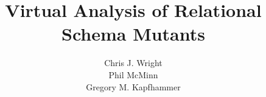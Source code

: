 \documentclass{sig-alternate}
\begin{document}
\title{Virtual Analysis of Relational Schema Mutants}


\author{
\alignauthor
Chris J. Wright\\
\alignauthor
Phil McMinn\\
\alignauthor
Gregory M. Kapfhammer\\
}

\maketitle








\end{document}
